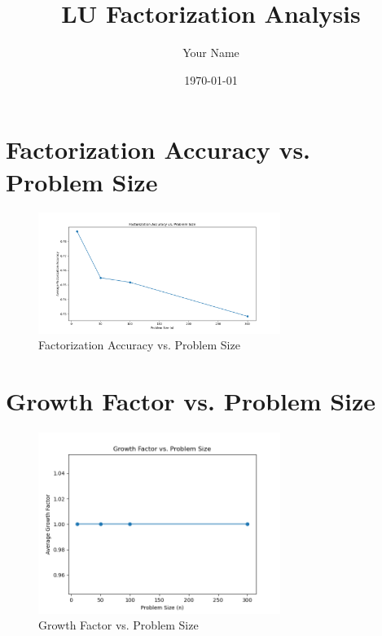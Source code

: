 \documentclass{article}
\begin{document}
\title{LU Factorization Analysis}
\author{Your Name}
\date{\today}
\maketitle

\section{Factorization Accuracy vs. Problem Size}
\begin{figure}[H]
    \centering
    \includegraphics[width=0.7\textwidth]{acc_over_n.png}
    \caption{Factorization Accuracy vs. Problem Size}
\end{figure}

\section{Growth Factor vs. Problem Size}
\begin{figure}[H]
    \centering
    \includegraphics[width=0.7\textwidth]{grow_fac.png}
    \caption{Growth Factor vs. Problem Size}
\end{figure}
\end{document}

